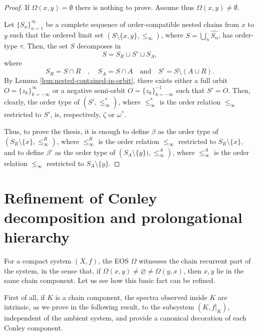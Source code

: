 \documentclass[10pt,a4paper]{article}
\theoremstyle{definition}
\theoremstyle{remark}
\theoremstyle{plain}
\begin{document}
\begin{proof}
If $\Omega(x,y)= \emptyset$ there is nothing to prove. Assume thus $\Omega(x,y)\neq \emptyset$.

Let $\{S_n\}_{n=1}^\infty$ be a complete sequence of order-compatible nested chains from $x$ to $y$ such that the ordered limit set $(S\setminus\{x,y\},\le_\infty)$, where $S=\bigcup_n\widehat{S_n}$, has order-type $\tau$. Then, the set $S$ decomposes in
$$S=S_R\sqcup S'\sqcup S_A,$$
where
$$S_R=S\cap R\quad,\quad S_A=S\cap A\quad\text{and}\quad S'=S\setminus(A\cup R).$$
By Lemma \ref{lem:nested-contained-in-orbit}, there exists either a full orbit $O=\{z_k\}_{k=-\infty}^\infty$ or a negative semi-orbit $O=\{z_k\}_{k=-\infty}^{-1}$ such that $S'=O$. Then, clearly, the order type of $(S',\le^* _\infty)$, where $\le^* _\infty$ is the order relation $\le_\infty$ restricted to $S'$, is, respectively, $\zeta$ or $\omega^*$.

Thus, to prove the thesis, it is enough to define $\beta$ as the order type of $\left(S_R\setminus\{x\},\le^R_\infty\right)$, where $\le^R_\infty$ is the order relation $\le_\infty$ restricted to $S_R\setminus\{x\}$, and to define $\beta'$ as the order type of $\left(S_A\setminus\{y\}),\le_\infty^A\right)$, where $\le_\infty^A$ is the order relation $\le_\infty$ restricted to $S_A\setminus\{y\}$.
\end{proof}


\section{Refinement of Conley decomposition and prolongational hierarchy}
\noindent For a compact system $(X,f)$, the EOS $\Omega$ witnesses the chain recurrent part of the system, in the sense that, if $\Omega(x,y)\neq\varnothing\neq\Omega(y,x)$, then $x,y$ lie in the same chain component. Let us see how this basic fact can be refined.


First of all, if $K$ is a chain component, the spectra observed inside $K$ are intrinsic, as we prove in the following result, to the subsystem $(K,f|_K)$, independent of the ambient system, and provide a canonical decoration of each Conley component. 
\end{document}
